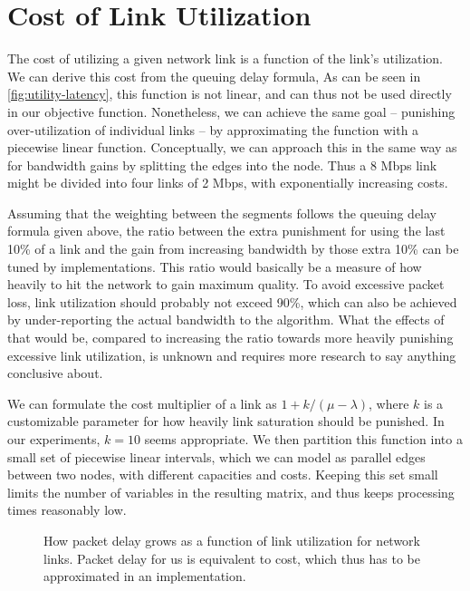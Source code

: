 \section{Cost of Link Utilization}

The cost of utilizing a given network link is a function of the link's utilization. We can derive this cost from the queuing delay formula,  As can be seen in \autoref{fig:utility-latency}, this function is not linear, and can thus not be used directly in our objective function. Nonetheless, we can achieve the same goal -- punishing over-utilization of individual links -- by approximating the function with a piecewise linear function. Conceptually, we can approach this in the same way as for bandwidth gains by splitting the edges into the node. Thus a 8 Mbps link might be divided into four links of 2 Mbps, with exponentially increasing costs.

Assuming that the weighting between the segments follows the queuing delay formula given above, the ratio between the extra punishment for using the last 10\% of a link and the gain from increasing bandwidth by those extra 10\% can be tuned by implementations. This ratio would basically be a measure of how heavily to hit the network to gain maximum quality. To avoid excessive packet loss, link utilization should probably not exceed 90\%, which can also be achieved by under-reporting the actual bandwidth to the algorithm. What the effects of that would be, compared to increasing the ratio towards more heavily punishing excessive link utilization, is unknown and requires more research to say anything conclusive about.

We can formulate the cost multiplier of a link as $1 + k/(\mu - \lambda)$, where $k$ is a customizable parameter for how heavily link saturation should be punished. In our experiments, $k=10$ seems appropriate. We then partition this function into a small set of piecewise linear intervals, which we can model as parallel edges between two nodes, with different capacities and costs. Keeping this set small limits the number of variables in the resulting matrix, and thus keeps processing times reasonably low.

\begin{figure}
    \centering
    \caption{How packet delay grows as a function of link utilization for network links. Packet delay for us is equivalent to cost, which thus has to be approximated in an implementation.}
    \label{fig:utility-latency}
\end{figure}



